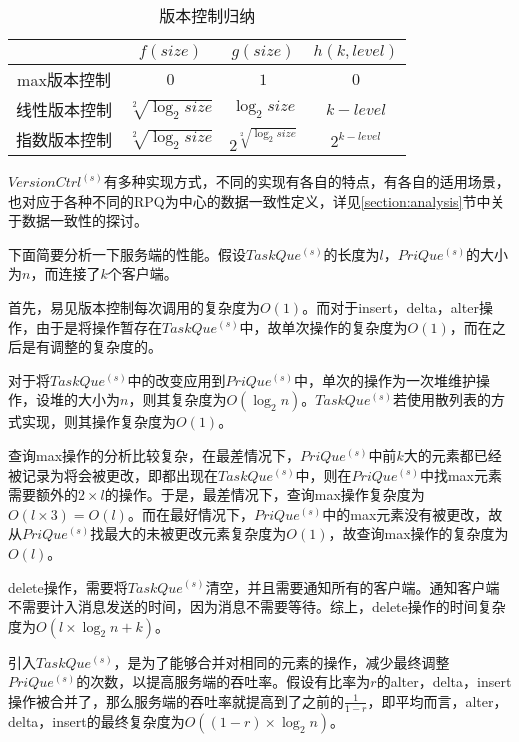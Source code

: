 			\begin{table}			
				\begin{center}
					\begin{tabular}{c|ccc}
						&$f(size)$&$g(size)$&$h(k,level)$\\
						\hline
						max版本控制&$0$&$1$&$0$\\
						线性版本控制&$\sqrt[2]{\log_2 size}$&$\log_2 size$&$k-level$\\
						指数版本控制&$\sqrt[2]{\log_2 size}$&$2^{\sqrt[2]{\log_2 size}}$&$2^{k-level}$\\
					\end{tabular}
				\end{center}			
				\caption{版本控制归纳}
				\label{table:Framework-VersionCtrl}
			\end{table}
			\par $VersionCtrl^{(s)}$有多种实现方式，不同的实现有各自的特点，有各自的适用场景，也对应于各种不同的RPQ为中心的数据一致性定义，详见\ref{section:analysis}节中关于数据一致性的探讨。
			\par 下面简要分析一下服务端的性能。假设$TaskQue^{(s)}$的长度为$l$，$PriQue^{(s)}$的大小为$n$，而连接了$k$个客户端。
			\par 首先，易见版本控制每次调用的复杂度为$O(1)$。而对于insert，delta，alter操作，由于是将操作暂存在$TaskQue^{(s)}$中，故单次操作的复杂度为$O(1)$，而在之后是有调整的复杂度的。
			\par 对于将$TaskQue^{(s)}$中的改变应用到$PriQue^{(s)}$中，单次的操作为一次堆维护操作，设堆的大小为$n$，则其复杂度为$O(\log_2 n)$。$TaskQue^{(s)}$若使用散列表的方式实现，则其操作复杂度为$O(1)$。
			\par 查询max操作的分析比较复杂，在最差情况下，$PriQue^{(s)}$中前$k$大的元素都已经被记录为将会被更改，即都出现在$TaskQue^{(s)}$中，则在$PriQue^{(s)}$中找max元素需要额外的$2\times l$的操作。于是，最差情况下，查询max操作复杂度为$O(l\times 3)=O(l)$。而在最好情况下，$PriQue^{(s)}$中的max元素没有被更改，故从$PriQue^{(s)}$找最大的未被更改元素复杂度为$O(1)$，故查询max操作的复杂度为$O(l)$。
			\par delete操作，需要将$TaskQue^{(s)}$清空，并且需要通知所有的客户端。通知客户端不需要计入消息发送的时间，因为消息不需要等待。综上，delete操作的时间复杂度为$O(l\times \log_2 n +k)$。
			\par 引入$TaskQue^{(s)}$，是为了能够合并对相同的元素的操作，减少最终调整$PriQue^{(s)}$的次数，以提高服务端的吞吐率。假设有比率为$r$的alter，delta，insert操作被合并了，那么服务端的吞吐率就提高到了之前的$\frac{1}{1-r}$，即平均而言，alter，delta，insert的最终复杂度为$O((1-r)\times\log_2 n)$。
